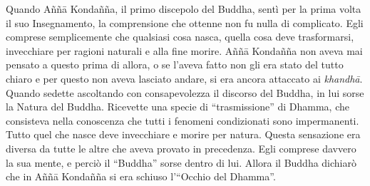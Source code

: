 Quando Aññā Kondañña, il primo discepolo del Buddha, sentì per la prima
volta il suo Insegnamento, la comprensione che ottenne non fu nulla di
complicato. Egli comprese semplicemente che qualsiasi cosa nasca, quella
cosa deve trasformarsi, invecchiare per ragioni naturali e alla fine
morire. Aññā Kondañña non aveva mai pensato a questo prima di allora, o
se l'aveva fatto non gli era stato del tutto chiaro e per questo non
aveva lasciato andare, si era ancora attaccato ai \emph{khandhā}. Quando
sedette ascoltando con consapevolezza il discorso del Buddha, in lui
sorse la Natura del Buddha. Ricevette una specie di ``trasmissione'' di
Dhamma, che consisteva nella conoscenza che tutti i fenomeni
condizionati sono impermanenti. Tutto quel che nasce deve invecchiare e
morire per natura. Questa sensazione era diversa da tutte le altre che
aveva provato in precedenza. Egli comprese davvero la sua mente, e
perciò il ``Buddha'' sorse dentro di lui. Allora il Buddha dichiarò che
in Aññā Kondañña si era schiuso l'``Occhio del Dhamma''.

